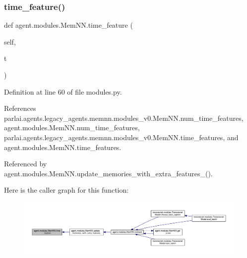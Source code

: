 \subsubsection{\texorpdfstring{time\+\_\+feature()}{time\_feature()}}
{\footnotesize\ttfamily def agent.\+modules.\+Mem\+N\+N.\+time\+\_\+feature (\begin{DoxyParamCaption}\item[{}]{self,  }\item[{}]{t }\end{DoxyParamCaption})}



Definition at line 60 of file modules.\+py.



References parlai.\+agents.\+legacy\+\_\+agents.\+memnn.\+modules\+\_\+v0.\+Mem\+N\+N.\+num\+\_\+time\+\_\+features, agent.\+modules.\+Mem\+N\+N.\+num\+\_\+time\+\_\+features, parlai.\+agents.\+legacy\+\_\+agents.\+memnn.\+modules\+\_\+v0.\+Mem\+N\+N.\+time\+\_\+features, and agent.\+modules.\+Mem\+N\+N.\+time\+\_\+features.



Referenced by agent.\+modules.\+Mem\+N\+N.\+update\+\_\+memories\+\_\+with\+\_\+extra\+\_\+features\+\_\+().

Here is the caller graph for this function\+:
\nopagebreak
\begin{figure}[H]
\begin{center}
\leavevmode
\includegraphics[width=350pt]{classagent_1_1modules_1_1MemNN_a1464c9a427996709f4a910a7b2d2487d_icgraph}
\end{center}
\end{figure}
\mbox{\label{classagent_1_1modules_1_1MemNN_a7f640b99845db4db6508e12e139e3b22}} 
